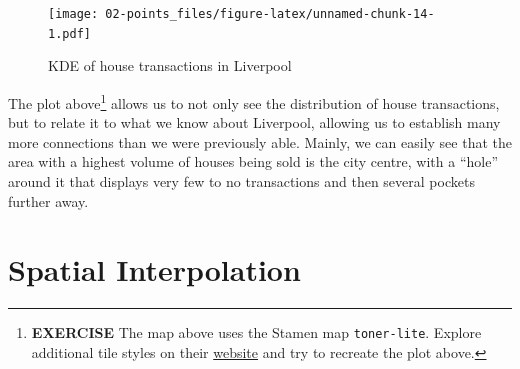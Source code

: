 \documentclass[]{book}
\newenvironment{Shaded}{\begin{snugshade}}{\end{snugshade}}
\newcommand{\KeywordTok}[1]{\textcolor[rgb]{0.13,0.29,0.53}{\textbf{#1}}}
\newcommand{\DataTypeTok}[1]{\textcolor[rgb]{0.13,0.29,0.53}{#1}}
\newcommand{\DecValTok}[1]{\textcolor[rgb]{0.00,0.00,0.81}{#1}}
\newcommand{\FloatTok}[1]{\textcolor[rgb]{0.00,0.00,0.81}{#1}}
\newcommand{\CharTok}[1]{\textcolor[rgb]{0.31,0.60,0.02}{#1}}
\newcommand{\StringTok}[1]{\textcolor[rgb]{0.31,0.60,0.02}{#1}}
\newcommand{\CommentTok}[1]{\textcolor[rgb]{0.56,0.35,0.01}{\textit{#1}}}
\newcommand{\OtherTok}[1]{\textcolor[rgb]{0.56,0.35,0.01}{#1}}
\newcommand{\OperatorTok}[1]{\textcolor[rgb]{0.81,0.36,0.00}{\textbf{#1}}}
\newcommand{\NormalTok}[1]{#1}
\begin{document}
\begin{Shaded}
\end{Shaded}

\begin{figure}
\centering
\texttt{[image: 02-points\_files/figure-latex/unnamed-chunk-14-1.pdf]}
\caption{\label{fig:unnamed-chunk-14}KDE of house transactions in Liverpool}
\end{figure}

The plot above\footnote{\textbf{EXERCISE} The map above uses the Stamen
  map \texttt{toner-lite}. Explore additional tile styles on their
  \href{http://maps.stamen.com/\#watercolor/12/37.7706/-122.3782}{website}
  and try to recreate the plot above.} allows us to not only see the
distribution of house transactions, but to relate it to what we know
about Liverpool, allowing us to establish many more connections than we
were previously able. Mainly, we can easily see that the area with a
highest volume of houses being sold is the city centre, with a ``hole''
around it that displays very few to no transactions and then several
pockets further away.

\section{Spatial Interpolation}\label{spatial-interpolation}
\end{document}
